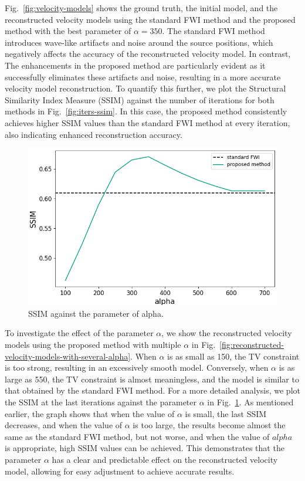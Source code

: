 Fig.~\ref{fig:velocity-models} shows the ground truth, the initial model, and the reconstructed velocity models using the standard FWI method and the proposed method with the best parameter of $\alpha = 350$.
The standard FWI method introduces wave-like artifacts and noise around the source positions, which negatively affects the accuracy of the reconstructed velocity model.
In contrast, The enhancements in the proposed method are particularly evident as it successfully eliminates these artifacts and noise, resulting in a more accurate velocity model reconstruction.
To quantify this further, we plot the Structural Similarity Index Measure (SSIM) against the number of iterations for both methods in Fig.~\ref{fig:iters-ssim}.
In this case, the proposed method consistently achieves higher SSIM values than the standard FWI method at every iteration, also indicating enhanced reconstruction accuracy.

\begin{figure}[htbp]
    \centering
    \includegraphics[width=\linewidth]{public/alpha-ssim}
    \caption{SSIM against the parameter of alpha.}
    \label{fig:alpha-ssim}
\end{figure}

To investigate the effect of the parameter $\alpha$, we show the reconstructed velocity models using the proposed method with multiple $\alpha$ in Fig.~\ref{fig:reconstructed-velocity-models-with-several-alpha}.
When $\alpha$ is as small as 150, the TV constraint is too strong, resulting in an excessively smooth model.
Conversely, when $\alpha$ is as large as 550, the TV constraint is almost meaningless, and the model is similar to that obtained by the standard FWI method.
For a more detailed analysis, we plot the SSIM at the last iterations against the parameter $\alpha$ in Fig.~\ref{fig:alpha-ssim}.
As mentioned earlier, the graph shows that when the value of $\alpha$ is small, the last SSIM decreases, and when the value of $\alpha$ is too large, the results become almost the same as the standard FWI method, but not worse, and when the value of $alpha$ is appropriate, high SSIM values can be achieved.
This demonstrates that the parameter $\alpha$ has a clear and predictable effect on the reconstructed velocity model, allowing for easy adjustment to achieve accurate results.

